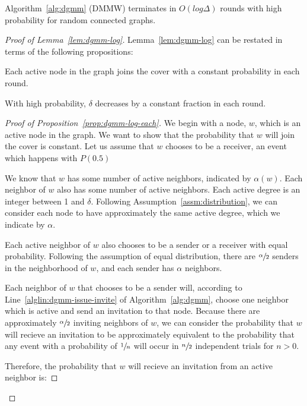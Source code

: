 \begin{lem}
\label{lem:dgmm-log}
Algorithm~\ref{alg:dgmm} (DMMW) terminates in $O(log \Delta)$ rounds with high probability for random connected graphs.
\end{lem}


\begin{proof}[Proof of Lemma~\ref{lem:dgmm-log}]


Lemma~\ref{lem:dgmm-log} can be restated in terms of the following propositions:
\begin{lprp}
\label{prop:dgmm-log-each}
Each active node in the graph joins the cover with a constant probability in each round.
\end{lprp}
\begin{lprp}
\label{prop:dgmm-log-alpha}
With high probability, $\delta$ decreases by a constant fraction in each round.
\end{lprp}
\begin{proof}[Proof of Proposition~\ref{prop:dgmm-log-each}]

We begin with a node, $w$, which is an active node in the graph. We want to show that the probability that $w$ will join the cover is constant. Let us assume that $w$ chooses to be a receiver, an event which happens with $P(0.5)$

We know that $w$ has some number of active neighbors, indicated by $\alpha(w)$. Each neighbor of $w$ also has some number of active neighbors. Each active degree is an integer between 1 and $\delta$. Following Assumption~\ref{assm:distribution}, we can consider each node to have approximately the same active degree, which we indicate by $\alpha$. 

Each active neighbor of $w$ also chooses to be a sender or a receiver with equal probability. Following the assumption of equal distribution, there are $\sfrac{\alpha}{2}$ senders in the neighborhood of $w$, and each sender has $\alpha$ neighbors.

Each neighbor of $w$ that chooses to be a sender will, according to Line~\ref{alglin:dgmm-issue-invite} of Algorithm~\ref{alg:dgmm}, choose one neighbor which is active and send an invitation to that node. Because there are approximately $\sfrac{\alpha}{2}$ inviting neighbors of $w$, we can consider the probability that $w$ will recieve an invitation to be approximately equivalent to the probability that any event with a probability of $\sfrac{1}{n}$ will occur in $\sfrac{n}{2}$ independent trials for $n > 0$. 

Therefore, the probability that $w$ will recieve an invitation from an active neighbor is: 


\end{proof}
\end{proof}
